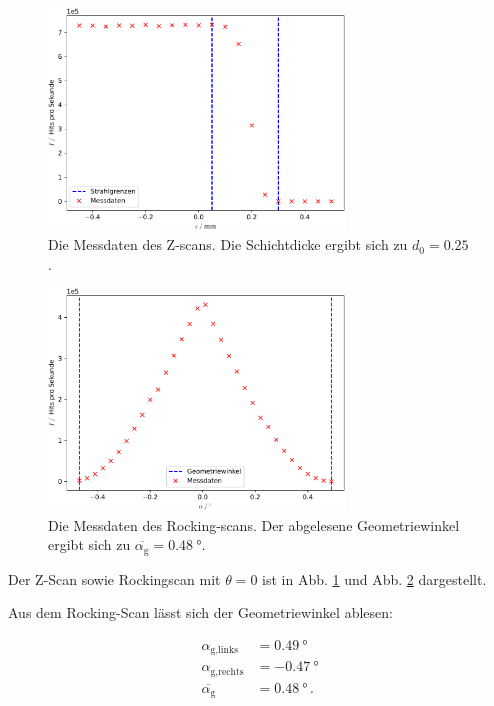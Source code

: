 \begin{figure}
    \centering
    \includegraphics[width=0.7\textwidth]{figures/zscan.pdf}
    \caption{Die Messdaten des Z-scans. Die Schichtdicke ergibt sich zu $d_0=\num{0.25}$.}
    \label{fig:zscanscan}
\end{figure}

\begin{figure}
    \centering
    \includegraphics[width=0.7\textwidth]{figures/rockingscan.pdf}
    \caption{Die Messdaten des Rocking-scans. Der abgelesene Geometriewinkel ergibt sich zu $\overline{\alpha_\text{g}} = \SI{0.48}{\degree}$.}
    \label{fig:rockingscan}
\end{figure}
  \noindent

Der Z-Scan sowie Rockingscan mit $\theta = 0$ ist in Abb. \ref{fig:zscanscan} und Abb. \ref{fig:rockingscan}
dargestellt.

Aus dem Rocking-Scan lässt sich der Geometriewinkel ablesen:

\begin{align*}
  \alpha_\text{g,links} &= \SI{0.49}{\degree} \\
  \alpha_\text{g,rechts} &= \SI{-0.47}{\degree} \\
  \overline{\alpha_\text{g}} &= \SI{0.48}{\degree} \, .
\end{align*}

